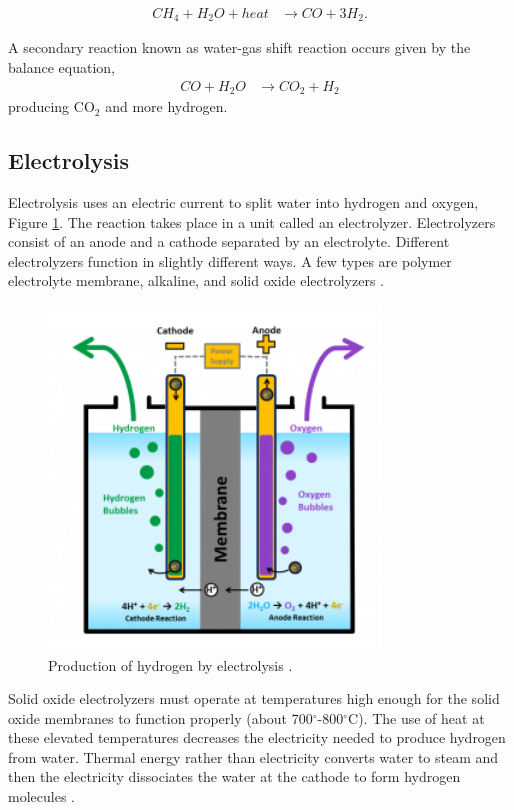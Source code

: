 \documentclass{anstrans}
\begin{document}
\begin{align}
CH_4 + H_2O + heat & \rightarrow CO + 3H_2 .
\label{eq:1}
\end{align}

A secondary reaction known as water-gas shift reaction occurs given by the balance equation,
\begin{align}
CO + H_2O & \rightarrow CO_2 + H_2
\label{eq:2}
\end{align}
producing CO$_2$ and more hydrogen.

\subsection{Electrolysis}

Electrolysis uses an electric current to split water into hydrogen and oxygen, Figure \ref{fig:electro}. The reaction takes place in a unit called an electrolyzer. Electrolyzers consist of an anode and a cathode separated by an electrolyte. Different electrolyzers function in slightly different ways. A few types are polymer electrolyte membrane, alkaline, and solid oxide electrolyzers \cite{noauthor_hydrogen_nodate}.

\begin{figure}[]
	\centering
	\includegraphics[width=0.55\linewidth]{figures/electrolysis.png}
	\hfill
	\caption{Production of hydrogen by electrolysis \cite{noauthor_hydrogen_nodate}.}
	\label{fig:electro}
\end{figure}

Solid oxide electrolyzers must operate at temperatures high enough for the solid oxide membranes to function properly (about 700$^{\circ}$-800$^{\circ}$C). The use of heat at these elevated temperatures decreases the electricity needed to produce hydrogen from water.
Thermal energy rather than electricity converts water to steam and then the electricity dissociates the water at the cathode to form hydrogen molecules \cite{xu_introduction_2017}.
\end{document}
